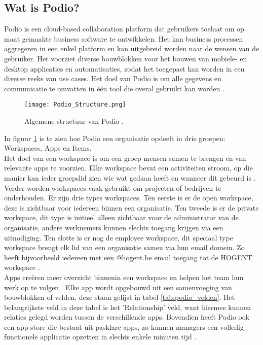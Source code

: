 \subsection{Wat is Podio?}
\label{subsec:wat_is_podio}

Podio is een cloud-based collaboration platform dat gebruikers toelaat om op maat gemaakte business software te ontwikkelen. Het kan business processen aggregeren in een enkel platform en kan uitgebreid worden naar de wensen van de gebruiker. Het voorziet diverse bouwblokken voor het bouwen van mobiele- en desktop applicaties en automatisaties, zodat het toegepast kan worden in een diverse reeks van use cases. Het doel van Podio is om alle gegevens en communicatie te omvatten in één tool die overal gebruikt kan worden \autocite{Podio}. \\ 

\begin{figure}[h]
    \centering
    \texttt{[image: Podio\_Structure.png]}
    \caption[Structuur Podio]{Algemene structuur van Podio \autocite{TallyfyPodio}.}
    \label{fig:podio_structure}
\end{figure}

In figuur \ref{fig:podio_structure} is te zien hoe Podio een organisatie opdeelt in drie groepen: Workspaces, Apps en Items. \\

Het doel van een workspace is om een groep mensen samen te brengen en van relevante apps te voorzien. Elke workspace bevat een activiteiten stroom, op die manier kan ieder groepslid zien wie wat gedaan heeft en wanneer dit gebeurd is \autocite{TallyfyPodio}. Verder worden workspaces vaak gebruikt om projecten of bedrijven te onderhouden. Er zijn drie types workspaces. Ten eerste is er de open workspace, deze is zichtbaar voor iedereen binnen een organisatie. Ten tweede is er de private workspace, dit type is initieel alleen zichtbaar voor de administrator van de organisatie, andere werknemers kunnen slechts toegang krijgen via een uitnodiging. Ten slotte is er nog de employee workspace, dit speciaal type workspace brengt elk lid van een organisatie samen via hun email domein. Zo heeft bijvoorbeeld iedereen met een @hogent.be email toegang tot de HOGENT workspace \autocite{PodioFeatures}. \\

Apps creëren meer overzicht binnenin een workspace en helpen het team hun werk op te volgen \autocite{PodioFeatures}. Elke app wordt opgebouwd uit een samenvoeging van bouwblokken of velden, deze staan gelijst in tabel \ref{tab:podio_velden}. Het belangrijkste veld in deze tabel is het 'Relationship' veld, want hiermee kunnen relaties gelegd worden tussen de verschillende apps. Bovendien heeft Podio ook een app store die bestaat uit pasklare apps, zo kunnen managers een volledig functionele applicatie opzetten in slechts enkele minuten tijd \autocite{TallyfyPodio}. \\

